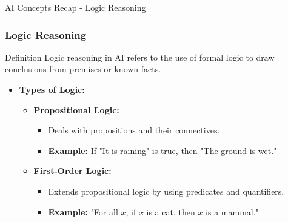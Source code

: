 \documentclass[aspectratio=169]{beamer}
\begin{document}
\begin{frame}[fragile]{AI Concepts Recap - Logic Reasoning}
    \frametitle{Logic Reasoning}

    \begin{block}{Definition}
        Logic reasoning in AI refers to the use of formal logic to draw conclusions from premises or known facts.
    \end{block}

    \begin{itemize}
        \item \textbf{Types of Logic:}
            \begin{itemize}
                \item \textbf{Propositional Logic:}
                    \begin{itemize}
                        \item Deals with propositions and their connectives.
                        \item \textbf{Example:} If "It is raining" is true, then "The ground is wet."
                    \end{itemize}
                \item \textbf{First-Order Logic:}
                    \begin{itemize}
                        \item Extends propositional logic by using predicates and quantifiers.
                        \item \textbf{Example:} "For all \( x \), if \( x \) is a cat, then \( x \) is a mammal."
                    \end{itemize}
            \end{itemize}
    \end{itemize}
\end{frame}
\end{document}
